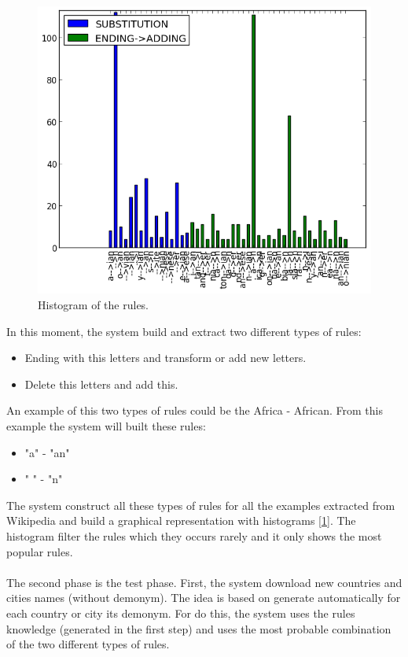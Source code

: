 \documentclass[]{report}
\begin{document}
\begin{figure}[htb!]
\centering
\includegraphics[scale=0.6]{img/rules}
\caption{Histogram of the rules.}
\label{Histogram of the rules.}
\end{figure}

In this moment, the system build and extract two different types of rules:
\begin{itemize}
\item Ending with this letters and transform or add new letters.
\item Delete this letters and add this.
\end{itemize}
An example of this two types of rules could be the Africa - African. From this example the system will built these rules:
\begin{itemize}
\item "a" - "an"
\item " " - "n"
\end{itemize}
The system construct all these types of rules for all the examples extracted from Wikipedia and build a graphical representation with histograms [\ref{Histogram of the rules.}]. The histogram filter the rules which they occurs rarely and it only shows the most popular rules.
\\\\The second phase is the test phase. First, the system download new countries and cities names (without demonym). The idea is based on generate automatically for each country or city its demonym. For do this, the system uses the rules knowledge (generated in the first step) and uses the most probable combination of the two different types of rules.
\end{document}
